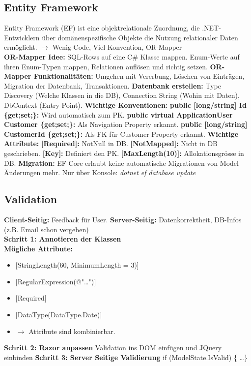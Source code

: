 \subsection{Entity Framework}
Entity Framework (EF) ist eine objektrelationale Zuordnung, die .NET-Entwicklern über domänenspezifische Objekte die Nutzung relationaler Daten ermöglicht. $\rightarrow$ Wenig Code, Viel Konvention, OR-Mapper\\
\textcolor{b}{\textbf{OR-Mapper Idee:}} SQL-Rows auf eine C\# Klasse mappen. Enum-Werte auf ihren Enum-Typen mappen, Relationen auflösen und richtig setzen. \textcolor{b}{\textbf{OR-Mapper Funktionalitäten:}} Umgehen mit Vererbung, Löschen von Einträgen, Migration der Datenbank, Transaktionen. \textcolor{b}{\textbf{Datenbank erstellen:}} Type Discovery (Welche Klassen in die DB), Connection String (Wohin mit Daten), DbContext (Entry Point). \textcolor{b}{\textbf{Wichtige Konventionen:}} \textbf{public [long/string] Id \{get;set;\}:} Wird automatisch zum PK. \textbf{public virtual ApplicationUser Customer \{get;set;\}:} Als Navigation Property erkannt. \textbf{public [long/string] CustomerId \{get;set;\}:} Als FK für Customer Property erkannt. \textcolor{b}{\textbf{Wichtige Attribute:}} \textbf{[Required]:} NotNull in DB. \textbf{[NotMapped]:} Nicht in DB geschrieben. \textbf{[Key]:} Definiert den PK. \textbf{[MaxLength(10)]:} Allokationsgrösse in DB. \textcolor{b}{\textbf{Migration:}} EF Core erlaubt keine automatische Migrationen von Model Änderungen mehr. Nur über Konsole: \textit{dotnet ef database update}
\subsection{Validation}
\textbf{Client-Seitig:} Feedback für User. \textbf{Server-Seitig:} Datenkorrektheit, DB-Infos (z.B. Email schon vergeben)\\
\textcolor{b}{\textbf{Schritt 1: Annotieren der Klassen}}\\
\textbf{Mögliche Attribute:}
\begin{itemize}[topsep=0pt, leftmargin=3mm]
  \setlength\itemsep{-0.3em}
  \item $[$StringLength(60, MinimumLength = 3)$]$
  \item $[$RegularExpression(@"\ldots")$]$
  \item $[$Required$]$
  \item $[$DataType(DataType.Date)$]$
  \item $\rightarrow$ Attribute sind kombinierbar.
\end{itemize}
\textcolor{b}{\textbf{Schritt 2: Razor anpassen}} Validation ins DOM einfügen und JQuery einbinden \textcolor{b}{\textbf{Schritt 3: Server Seitige Validierung}} if (ModelState.IsValid) \{ \ldots \}
